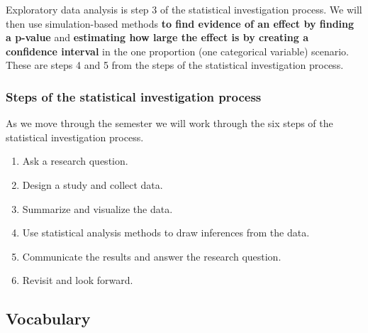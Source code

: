 \documentclass[
]{report}
\begin{document}
Exploratory data analysis is step 3 of the statistical investigation process. We will then use simulation-based methods \textbf{to find evidence of an effect by finding a p-value} and \textbf{estimating how large the effect is by creating a confidence interval} in the one proportion (one categorical variable) scenario. These are steps 4 and 5 from the steps of the statistical investigation process.

\subsubsection*{Steps of the statistical investigation process}\label{steps-of-the-statistical-investigation-process-1}

As we move through the semester we will work through the six steps of the statistical investigation process.

\begin{enumerate}
\def\labelenumi{\arabic{enumi}.}
\item
  Ask a research question.
\item
  Design a study and collect data.
\item
  Summarize and visualize the data.
\item
  Use statistical analysis methods to draw inferences from the data.
\item
  Communicate the results and answer the research question.
\item
  Revisit and look forward.
\end{enumerate}

\subsection{Vocabulary}\label{vocabulary-2}
\end{document}
